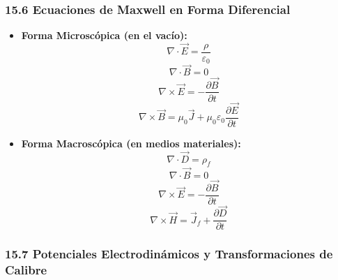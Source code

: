 \documentclass[11pt,a4paper]{article}
\begin{document}
\subsubsection*{15.6 Ecuaciones de Maxwell en Forma Diferencial}

\begin{itemize}
  \item \textbf{Forma Microscópica (en el vacío):}
  \[
    \nabla \cdot \vec{E} = \frac{\rho}{\varepsilon_0}
  \]
  \[
    \nabla \cdot \vec{B} = 0
  \]
  \[
    \nabla \times \vec{E} = -\frac{\partial \vec{B}}{\partial t}
  \]
  \[
    \nabla \times \vec{B} = \mu_0 \vec{J} + \mu_0 \varepsilon_0 \frac{\partial \vec{E}}{\partial t}
  \]
  \item \textbf{Forma Macroscópica (en medios materiales):}
  \[
    \nabla \cdot \vec{D} = \rho_f
  \]
  \[
    \nabla \cdot \vec{B} = 0
  \]
  \[
    \nabla \times \vec{E} = -\frac{\partial \vec{B}}{\partial t}
  \]
  \[
    \nabla \times \vec{H} = \vec{J}_f + \frac{\partial \vec{D}}{\partial t}
  \]
\end{itemize}

\subsubsection*{15.7 Potenciales Electrodinámicos y Transformaciones de Calibre}
\end{document}
